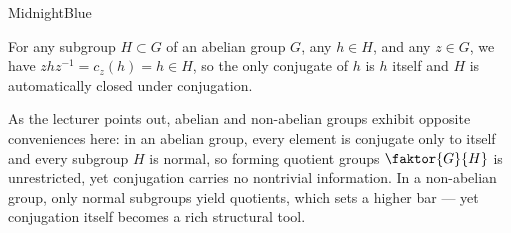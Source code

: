 \begin{content}

\begin{highlight}{MidnightBlue}
\end{highlight}

\begin{steps}
For any subgroup $H \subset G$ of an abelian group $G$, any $h \in H$, and any $z \in G$, we have $z h z^{-1} = c_z(h) = h \in H$, so the only conjugate of $h$ is $h$ itself and $H$ is automatically closed under conjugation.
\end{steps}
\end{content}

\begin{insight}
As the lecturer points out, abelian and non-abelian groups exhibit opposite conveniences here: in an abelian group, every element is conjugate only to itself and every subgroup $H$ is normal, so forming quotient groups $\faktor{G}{H}$ is unrestricted, yet conjugation carries no nontrivial information. In a non-abelian group, only normal subgroups yield quotients, which sets a higher bar --- yet conjugation itself becomes a rich structural tool.
\end{insight}

\begin{hidden}
\end{hidden}

